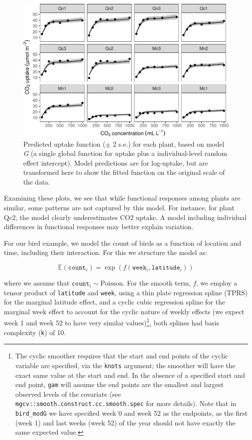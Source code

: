 \documentclass[12pt]{article}
\let\rmarkdownfootnote\footnote%
\def\footnote{\protect\rmarkdownfootnote}
\begin{document}
\begin{figure}
\includegraphics[width=\linewidth]{../figures/co2_modG_ggplot-1} \caption{\label{fig:co2_modG_predict} Predicted uptake function ($\pm$ 2 s.e.) for each plant, based on model \emph{G} (a single global function for uptake plus a individual-level random effect intercept). Model predictions are for log-uptake, but are transformed here to show the fitted function on the original scale of the data.}\label{fig:co2_modG_ggplot}
\end{figure}

Examining these plots, we see that while functional responses among
plants are similar, some patterns are not captured by this model. For
instance, for plant Qc2, the model clearly underestimates CO2 uptake. A
model including individual differences in functional responses may
better explain variation.

For our bird example, we model the count of birds as a function of
location and time, including their interaction. For this we structure
the model as:

\[
\mathbb{E}(\texttt{count}_i) = \exp(f(\texttt{week}_i, \texttt{latitude}_i))
\]

where we assume that \(\texttt{count}_i \sim\text{Poisson}\). For the
smooth term, \(f\), we employ a tensor product of \texttt{latitude} and
\texttt{week}, using a thin plate regression spline (TPRS) for the
marginal latitude effect, and a cyclic cubic regression spline for the
marginal week effect to account for the cyclic nature of weekly effects
(we expect week 1 and week 52 to have very similar values)\footnote{The
  cyclic smoother requires that the start and end points of the cyclic
  variable are specified, via the \texttt{knots} argument; the smoother
  will have the exact same value at the start and end. In the absence of
  a specified start and end point, \texttt{gam} will assume the end
  points are the smallest and largest observed levels of the covariate
  (see \texttt{mgcv::smooth.construct.cc.smooth.spec} for more details).
  Note that in \texttt{bird\_modG} we have specified week 0 and week 52
  as the endpoints, as the first (week 1) and last weeks (week 52) of
  the year should not have exactly the same expected value.}, both
splines had basis complexity (\texttt{k}) of 10.
\end{document}
